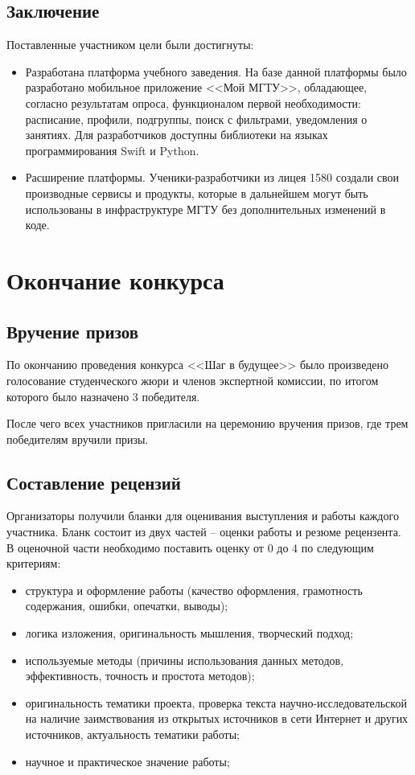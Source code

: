 \documentclass[12pt]{report}
\begin{document}
\section{Заключение}

Поставленные участником цели были достигнуты:

\begin{itemize}
	\item Разработана платформа учебного заведения. На базе данной платформы
	было разработано мобильное приложение <<Мой МГТУ>>, обладающее, согласно результатам опроса, функционалом первой необходимости: расписание, профили, подгруппы, поиск с фильтрами, уведомления о занятиях. Для
	разработчиков доступны библиотеки на языках программирования Swift и
	Python.
	\item Расширение платформы. Ученики-разработчики из лицея 1580 создали свои
	производные сервисы и продукты, которые в дальнейшем могут быть
	использованы в инфраструктуре МГТУ без дополнительных изменений
	в коде.
\end{itemize}

\chapter{Окончание конкурса}

\section{Вручение призов}

По окончанию проведения конкурса <<Шаг в будущее>>
было произведено голосование студенческого жюри и членов экспертной комиссии, 
по итогом которого было назначено 3 победителя. 

После чего всех участников пригласили на церемонию вручения призов, где трем победителям вручили призы.

\section{Составление рецензий}

Организаторы получили бланки для оценивания выступления и работы каждого участника.
Бланк состоит из двух частей -- оценки работы и резюме рецензента. 
В оценочной части необходимо поставить оценку от 0 до 4 по следующим критериям:

\begin{itemize}
	\item структура и оформление работы (качество оформления, грамотность содержания, ошибки, опечатки, выводы);
	\item логика изложения, оригинальность мышления, творческий подход;
	\item используемые методы (причины использования данных методов, эффективность, точность и простота методов);
	\item оригинальность тематики проекта, проверка текста научно-исследовательской на наличие заимствования из открытых
	источников в сети Интернет и других источников, актуальность тематики работы;
	\item научное и практическое значение работы;
\end{itemize}
\end{document}

